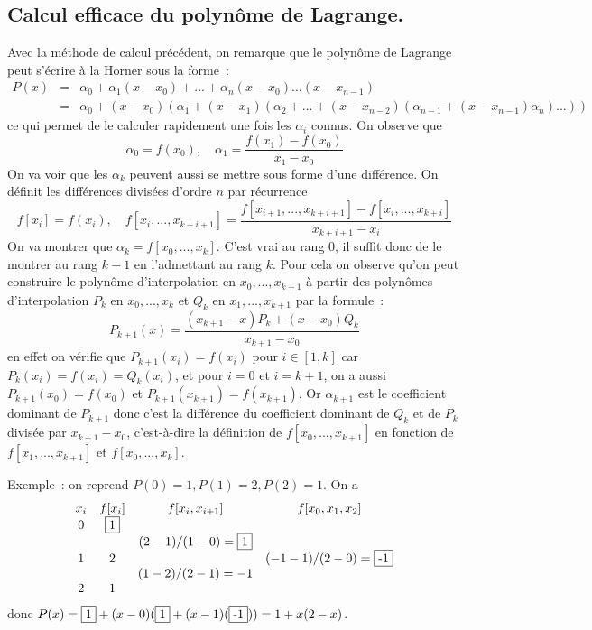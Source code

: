 \documentclass[a4paper,11pt]{book}
\begin{document}
\begin{giacjshere}
\subsection{Calcul efficace du polyn\^ome de
  Lagrange.}
Avec la m\'ethode de calcul pr\'ec\'edent, on remarque que le
polyn\^ome de Lagrange peut s'\'ecrire \`a la Horner sous la forme~:
\begin{eqnarray*}
 P(x) &=& \alpha_0 + \alpha_1 (x-x_0) + ... + \alpha_n
 (x-x_0)...(x-x_{n-1}) \\
&=& \alpha_0 + (x-x_0)( \alpha_1 + (x-x_1)(\alpha_2 +  ... +
(x-x_{n-2})(\alpha_{n-1}+(x-x_{n-1}) \alpha_n)...))
\end{eqnarray*}
ce qui permet de le calculer rapidement une fois les $\alpha_i$
connus.
On observe que 
\[ \alpha_0=f(x_0), \quad \alpha_1=\frac{f(x_1)-f(x_0)}{x_1-x_0} \]
On va voir que les $\alpha_k$ peuvent aussi se mettre sous forme
d'une diff\'erence.
On d\'efinit les diff\'erences divis\'ees d'ordre $n$ par r\'ecurrence
\[ f[x_i]=f(x_i), \quad f[x_i,...,x_{k+i+1}]=
\frac{f[x_{i+1},...,x_{k+i+1}]-f[x_i,...,x_{k+i}]}{x_{k+i+1}-x_i} \]
On va montrer que $\alpha_k=f[x_0,...,x_k]$.
C'est vrai au rang 0, il suffit donc de le montrer au rang $k+1$ en
l'admettant au rang $k$. Pour cela on observe qu'on peut construire 
le polyn\^ome d'interpolation en $x_0,...,x_{k+1}$ \`a partir des polyn\^omes 
d'interpolation $P_k$ en $x_0,...,x_k$ et $Q_k$ en $x_1,...,x_{k+1}$ 
par la formule~:
\[ P_{k+1}(x)= \frac{(x_{k+1}-x)P_k + (x-x_0)Q_k}{x_{k+1}-x_0}\]
en effet on v\'erifie que $P_{k+1}(x_i)=f(x_i)$ pour $i\in [1,k]$ car
$P_k(x_i)=f(x_i)=Q_k(x_i)$,
et pour $i=0$ et $i=k+1$, on a aussi $P_{k+1}(x_0)=f(x_0)$ et  
$P_{k+1}(x_{k+1})=f(x_{k+1})$.
Or $\alpha_{k+1}$ est le coefficient dominant de $P_{k+1}$ donc
c'est la diff\'erence du coefficient dominant de $Q_k$ et de $P_k$
divis\'ee par $x_{k+1}-x_0$, c'est-\`a-dire la d\'efinition de 
$f[x_0,...,x_{k+1}]$ en fonction de $f[x_1,...,x_{k+1}]$ et $f[x_0,...,x_{k}]$.

Exemple~: on reprend $P(0)=1, P(1)=2, P(2)=1$. On a
\[
\begin{array}{cccc}
x_i & f[x_i] & f[x_i,x_{i+1}] & f[x_0,x_1,x_2] \\
0 & \framebox{1} & & \\
  &   & (2-1)/(1-0)=\framebox{1} & \\
1 & 2 & &  (-1-1)/(2-0)=\framebox{-1}   \\
  &   & (1-2)/(2-1)=-1 & \\
2 & 1 & & \\
\end{array}
\]
donc $P(x)=\framebox{1}+(x-0)(\framebox{1}+(x-1)(\framebox{-1}))=1+x(2-x)$.


\end{giacjshere}
\end{document}
